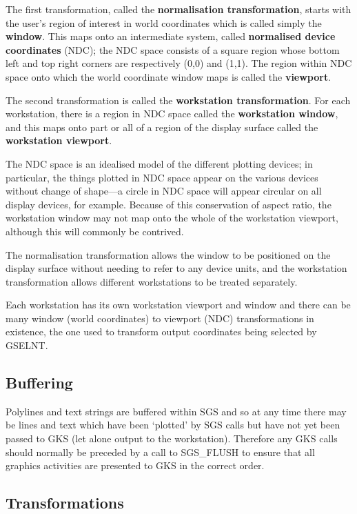 \documentclass[11pt]{article}
\newcommand{\htmlref}[2]{#1}
\begin{document}
The first transformation, called the
{\bf normalisation transformation}, starts with the user's region
of interest in world coordinates which is called simply
the {\bf window}.  This maps onto an intermediate
system, called {\bf normalised device coordinates} (NDC);  the
NDC space consists
of a square region whose bottom left
and top right corners are respectively (0,0) and (1,1).  The
region within NDC space onto which the world coordinate
window maps is called the {\bf viewport}.

The second transformation is called the {\bf workstation
transformation}.  For each workstation, there
is a region in NDC space called the {\bf workstation
window}, and this maps onto part or
all of a region of the
display surface called the {\bf workstation viewport}.

The NDC space is an idealised model of the different
plotting devices;  in particular, the things plotted
in NDC space appear on the various devices without
change of shape---a circle in NDC space will appear
circular on all display devices, for example.  Because of this
conservation of aspect ratio, the workstation window
may not map onto the whole of the workstation
viewport, although this will commonly
be contrived.

The normalisation transformation allows
the window to be positioned
on the display surface without needing to refer to any
device units, and the workstation transformation
allows different workstations
to be treated separately.

Each workstation has its own workstation viewport and window and there can
be many window (world coordinates) to viewport (NDC)
transformations in existence, 
the one used to transform output coordinates being selected by GSELNT.

\subsection* {Buffering}

Polylines and text strings are buffered within SGS and so at any time there
may be lines and text which have been `plotted' by SGS calls but have not yet
been passed to GKS (let alone output to the workstation).
Therefore any GKS calls should normally be preceded by a call to 
\htmlref{SGS\_FLUSH}{SGS_FLUSH} to
ensure that all graphics activities are presented to GKS  in the correct order.

\subsection* {Transformations}
\end{document}
